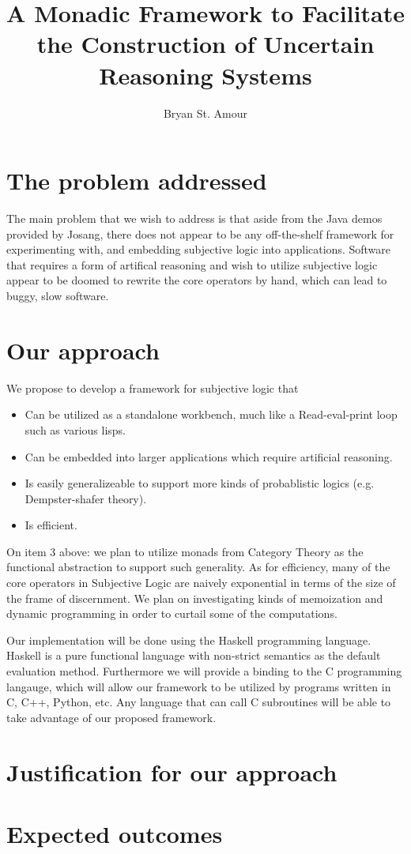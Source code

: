\documentclass[a4paper]{article}
\title{A Monadic Framework to Facilitate the Construction of Uncertain Reasoning Systems}
\author{Bryan St. Amour}
\begin{document}
\maketitle

\section{The problem addressed}

\par
The main problem that we wish to address is that aside from the Java demos provided
by Josang, there does not appear to be any off-the-shelf framework for experimenting
with, and embedding subjective logic into applications. Software that requires a form
of artifical reasoning and wish to utilize subjective logic appear to be doomed to
rewrite the core operators by hand, which can lead to buggy, slow software.

\section{Our approach}

\par
We propose to develop a framework for subjective logic that

\begin{itemize}
	\item Can be utilized as a standalone workbench, much like a Read-eval-print loop such as various lisps.
	\item Can be embedded into larger applications which require artificial reasoning.
	\item Is easily generalizeable to support more kinds of probablistic logics (e.g. Dempster-shafer theory).
	\item Is efficient.
\end{itemize}

\par
On item 3 above: we plan to utilize monads from Category Theory as the functional abstraction
to support such generality. As for efficiency, many of the core operators in Subjective Logic
are naively exponential in terms of the size of the frame of discernment. We plan on investigating
kinds of memoization and dynamic programming in order to curtail some of the computations.

\par
Our implementation will be done using the Haskell programming language. Haskell is a pure functional
language with non-strict semantics as the default evaluation method. Furthermore we will provide a
binding to the C programming langauge, which will allow our framework to be utilized by programs
written in C, C++, Python, etc. Any language that can call C subroutines will be able to take
advantage of our proposed framework.

\section{Justification for our approach}


\section{Expected outcomes}
\end{document}
